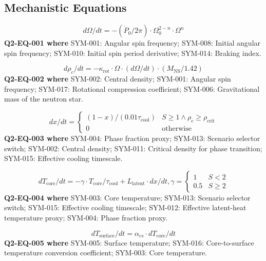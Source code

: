 \documentclass[11pt]{article}
\begin{document}
\subsection{Mechanistic Equations}

\begin{equation}\label{eq:Q2-EQ-001}
d\Omega/dt = -(\dot{P}_0 / 2\pi) \cdot \Omega_0^{2-n} \cdot \Omega^n
\end{equation}
\noindent\textbf{Q2-EQ-001 where} SYM-001: Angular spin frequency; SYM-008: Initial angular spin frequency; SYM-010: Initial spin period derivative; SYM-014: Braking index.

\begin{equation}\label{eq:Q2-EQ-002}
d\rho_c/dt = -\kappa_{\mathrm{rot}} \cdot \Omega \cdot (d\Omega/dt) \cdot (M_{\mathrm{NS}}/1.42)
\end{equation}
\noindent\textbf{Q2-EQ-002 where} SYM-002: Central density; SYM-001: Angular spin frequency; SYM-017: Rotational compression coefficient; SYM-006: Gravitational mass of the neutron star.

\begin{equation}\label{eq:Q2-EQ-003}
dx/dt = \begin{cases} (1-x)/(0.01\tau_{\mathrm{cool}}) & S \geq 1 \land \rho_c \geq \rho_{\mathrm{crit}} \\ 0 & \mathrm{otherwise} \end{cases}
\end{equation}
\noindent\textbf{Q2-EQ-003 where} SYM-004: Phase fraction proxy; SYM-013: Scenario selector switch; SYM-002: Central density; SYM-011: Critical density for phase transition; SYM-015: Effective cooling timescale.

\begin{equation}\label{eq:Q2-EQ-004}
dT_{\mathrm{core}}/dt = -\gamma \cdot T_{\mathrm{core}}/\tau_{\mathrm{cool}} + L_{\mathrm{latent}} \cdot dx/dt,   \gamma = \begin{cases} 1 & S < 2 \\ 0.5 & S \geq 2 \end{cases}
\end{equation}
\noindent\textbf{Q2-EQ-004 where} SYM-003: Core temperature; SYM-013: Scenario selector switch; SYM-015: Effective cooling timescale; SYM-012: Effective latent-heat temperature proxy; SYM-004: Phase fraction proxy.

\begin{equation}\label{eq:Q2-EQ-005}
dT_{\mathrm{surface}}/dt = \alpha_{cs} \cdot dT_{\mathrm{core}}/dt
\end{equation}
\noindent\textbf{Q2-EQ-005 where} SYM-005: Surface temperature; SYM-016: Core-to-surface temperature conversion coefficient; SYM-003: Core temperature.
\end{document}

